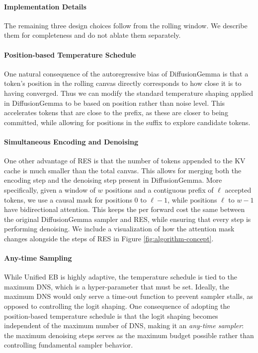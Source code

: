 \paragraph{Implementation Details}
The remaining three design choices follow from the rolling window. We describe them for completeness and do not ablate them separately.

\paragraph{Position-based Temperature Schedule}
One natural consequence of the autoregressive bias of DiffusionGemma is that a token's position in the rolling canvas directly corresponds to how close it is to having converged. 
Thus we can modify the standard temperature shaping applied in DiffusionGemma to be based on position rather than noise level. 
This accelerates tokens that are close to the prefix, as these are closer to being committed, while allowing for positions in the suffix to explore candidate tokens.

\paragraph{Simultaneous Encoding and Denoising}
One other advantage of RES is that the number of tokens appended to the KV cache is much smaller than the total canvas. This allows for merging both the encoding step and the denoising step present in DiffusionGemma. 
More specifically, given a window of $w$ positions and a contiguous prefix of $\ell$ accepted tokens, we use a causal mask for positions $0$ to $\ell-1$, while positions $\ell$ to $w-1$ have bidirectional attention.
This keeps the per forward cost the same between the original DiffusionGemma sampler and RES, while ensuring that every step is performing denoising. 
We include a visualization of how the attention mask changes alongside the steps of RES in Figure \ref{fig:algorithm-concept}. 

\paragraph{Any-time Sampling}
While Unified EB is highly adaptive, the temperature schedule is tied to the maximum DNS, which is a hyper-parameter that must be set. 
Ideally, the maximum DNS would only serve a time-out function to prevent sampler stalls, as opposed to controlling the logit shaping.
One consequence of adopting the position-based temperature schedule is that the logit shaping becomes independent of the maximum number of DNS, making it an \textit{any-time sampler}: the maximum denoising steps serves as the maximum budget possible rather than controlling fundamental sampler behavior.